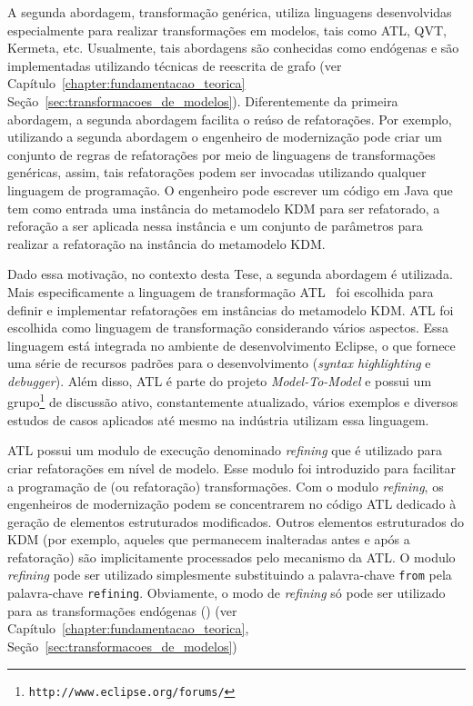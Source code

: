 A segunda abordagem, transformação genérica, utiliza linguagens desenvolvidas especialmente para realizar transformações em modelos, tais como ATL, QVT, Kermeta, etc. Usualmente, tais abordagens são conhecidas como endógenas e são implementadas utilizando técnicas de reescrita de grafo (ver Capítulo~\ref{chapter:fundamentacao_teorica} Seção~\ref{sec:transformacoes_de_modelos}). Diferentemente da primeira abordagem, a segunda abordagem facilita o reúso de refatorações. Por exemplo, utilizando a segunda abordagem o engenheiro de modernização pode criar um conjunto de regras de refatorações por meio de linguagens de transformações genéricas, assim, tais refatorações podem ser invocadas utilizando qualquer linguagem de programação. O engenheiro pode escrever um código em Java que tem como entrada uma instância do metamodelo KDM para ser refatorado, a reforação a ser aplicada nessa instância e um conjunto de parâmetros para realizar a refatoração na instância do metamodelo KDM.

Dado essa motivação, no contexto desta Tese, a segunda abordagem é utilizada. Mais especificamente a linguagem de transformação ATL~\cite{ATL_eclipse,Jouault_2008} foi escolhida para definir e implementar refatorações em instâncias do metamodelo KDM. ATL foi escolhida como linguagem de transformação considerando vários aspectos. Essa linguagem está integrada no ambiente de desenvolvimento Eclipse, o que fornece uma série de recursos padrões para o desenvolvimento (\textit{syntax highlighting} e \textit{debugger}). Além disso, ATL é parte do projeto \textit{Model-To-Model} e possui um grupo\footnote{\texttt{http://www.eclipse.org/forums/}} de discussão ativo, constantemente atualizado, vários exemplos e diversos estudos de casos aplicados até mesmo na indústria utilizam essa linguagem.


ATL possui um modulo de execução denominado \textit{refining} que é utilizado para criar refatorações em nível de modelo. Esse modulo foi introduzido para facilitar a programação de (ou refatoração) transformações. Com o modulo \textit{refining}, os engenheiros de modernização podem se concentrarem no código ATL dedicado à geração de elementos estruturados modificados. Outros elementos estruturados do KDM (por exemplo, aqueles que permanecem inalteradas antes e após a refatoração) são implicitamente processados pelo mecanismo da ATL. O modulo \textit{refining} pode ser utilizado simplesmente substituindo a palavra-chave \texttt{from} pela palavra-chave \texttt{refining}. Obviamente, o modo de \textit{refining} só pode ser utilizado para as transformações endógenas () (ver Capítulo~\ref{chapter:fundamentacao_teorica}, Seção~\ref{sec:transformacoes_de_modelos})


